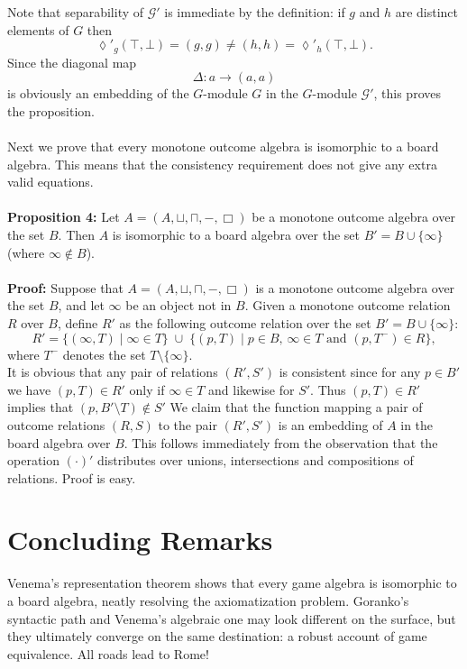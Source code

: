 \documentclass[12pt]{article}
\begin{document}
Note that separability of $\mathcal{G}'$ is immediate by the definition: 
if $g$ and $h$ are distinct elements of $G$ then 
\[
\lozenge'_g(\top, \bot) = (g,g) \neq (h,h) = \lozenge'_h(\top, \bot).
\]
Since the diagonal map 
\[
\Delta : a \to (a,a)
\]
is obviously an embedding of the $G$-module $G$ in the $G$-module $\mathcal{G}'$, 
this proves the proposition.\\ \\
Next we prove that every monotone outcome algebra is isomorphic to a board algebra. 
This means that the consistency requirement does not give any extra valid equations. \\ \\
\textbf{Proposition 4:} 
Let $A = (A, \sqcup, \sqcap, -, \Box)$ be a monotone outcome algebra over the set $B$. 
Then $A$ is isomorphic to a board algebra over the set $B' = B \cup \{\infty\}$ (where $\infty \notin B$).\\ \\
\textbf{Proof:} 
Suppose that $A = (A, \sqcup, \sqcap, -, \Box)$ is a monotone outcome algebra over the set $B$, 
and let $\infty$ be an object not in $B$. 
Given a monotone outcome relation $R$ over $B$, define $R'$ as the following outcome relation over the set $B' = B \cup \{\infty\}$:
\[
R' = \{ (\infty, T) \mid \infty \in T \} \;\cup\; \{ (p,T) \mid p \in B, \, \infty \in T \text{ and } (p, T^{-}) \in R \},
\]
where $T^{-}$ denotes the set $T \setminus \{\infty\}$. \\
It is obvious that any pair of relations $(R', S')$ is consistent since for any $p \in B'$ we have 
$(p,T) \in R'$ only if $\infty \in T$ and likewise for $S'$. 
Thus $(p,T) \in R'$ implies that $(p, B' \setminus T) \notin S'$
We claim that the function mapping a pair of outcome relations $(R,S)$ to the pair $(R',S')$ is an embedding of $A$ in the board algebra over $B$. 
This follows immediately from the observation that the operation $(\cdot)'$ distributes over unions, intersections and compositions of relations. Proof is easy. 
\section{Concluding Remarks}
Venema’s representation theorem shows that every game algebra is isomorphic to a board algebra, neatly resolving the axiomatization problem. Goranko’s syntactic path and Venema’s algebraic one may look different on the surface, but they ultimately converge on the same destination: a robust account of game equivalence. All roads lead to Rome!
\end{document}
